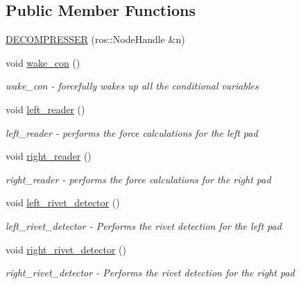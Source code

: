 \subsection*{Public Member Functions}
\begin{DoxyCompactItemize}
\item 
\hyperlink{class_d_e_c_o_m_p_r_e_s_s_e_r_a55b9b97e2a904351b670bb8d0b418976}{D\-E\-C\-O\-M\-P\-R\-E\-S\-S\-E\-R} (ros\-::\-Node\-Handle \&n)
\item 
void \hyperlink{class_d_e_c_o_m_p_r_e_s_s_e_r_a0ec0e540c96a4ca08f1525ed85785964}{wake\-\_\-con} ()
\begin{DoxyCompactList}\small\item\em wake\-\_\-con -\/ forcefully wakes up all the conditional variables \end{DoxyCompactList}\item 
void \hyperlink{class_d_e_c_o_m_p_r_e_s_s_e_r_ad369a64e880f213addbfe485e101e252}{left\-\_\-reader} ()
\begin{DoxyCompactList}\small\item\em left\-\_\-reader -\/ performs the force calculations for the left pad \end{DoxyCompactList}\item 
void \hyperlink{class_d_e_c_o_m_p_r_e_s_s_e_r_a197f1deb0b828a7d8ead5628732f7eb4}{right\-\_\-reader} ()
\begin{DoxyCompactList}\small\item\em right\-\_\-reader -\/ performs the force calculations for the right pad \end{DoxyCompactList}\item 
void \hyperlink{class_d_e_c_o_m_p_r_e_s_s_e_r_a96a68a95a775f15d93bfa6ffe36ff5a3}{left\-\_\-rivet\-\_\-detector} ()
\begin{DoxyCompactList}\small\item\em left\-\_\-rivet\-\_\-detector -\/ Performs the rivet detection for the left pad \end{DoxyCompactList}\item 
void \hyperlink{class_d_e_c_o_m_p_r_e_s_s_e_r_ae4ed92ca1fcf52b543b15022b9669723}{right\-\_\-rivet\-\_\-detector} ()
\begin{DoxyCompactList}\small\item\em right\-\_\-rivet\-\_\-detector -\/ Performs the rivet detection for the right pad \end{DoxyCompactList}\end{DoxyCompactItemize}
